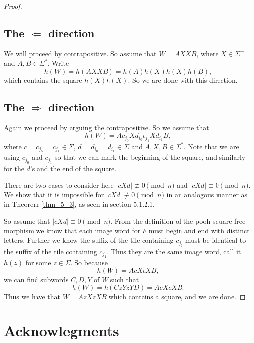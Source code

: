 \documentclass[12pt]{amsart}
\theoremstyle{definition}
\theoremstyle{plain}
\theoremstyle{nameit}
\theoremstyle{plain}
\begin{document}
\begin{onehalfspace}
\begin{proof}
\subsection{The $\Leftarrow$ direction} We will proceed by contrapositive. So assume that $W = AXXB$,
where $X\in\Sigma^+$ and $A,B\in\Sigma^*$. Write
\[h(W) = h(AXXB) = h(A)h(X)h(X)h(B),\]
which contains the square $h(X)h(X)$. So we are done with this direction.

\subsection{The $\Rightarrow$ direction} Again we proceed by arguing the contrapositive. So we assume
that
\begin{equation}
h(W) = Ac_{j_0}Xd_{i_0}c_{j_1}Xd_{i_1}B,
\label{eq_5_3}
\end{equation}
where $c=c_{j_0}=c_{j_1}\in\Sigma$, $d = d_{i_0} = d_{i_1}\in\Sigma$ and $A,X,B\in\Sigma^*$. Note that
we are using $c_{j_0}$ and $c_{j_1}$ so that we can mark the beginning of the square, and similarly for
the $d$'s and the end of the square.

There are two cases to consider here $|cXd|\not\equiv 0 \pmod{n}$ and $|cXd|\equiv 0 \pmod{n}$. We
show
that it is impossible for $|cXd|\not\equiv 0 \pmod{n}$ in an analogous manner as in Theorem
\ref{thm_5_3},
as seen in section 5.1.2.1.

So assume that $|cXd|\equiv 0 \pmod{n}$. From the definition of the pooh square-free morphism we know
that each image word for $h$ must begin and end with distinct letters. Further we know the suffix of the
tile containing $c_{j_0}$ must be identical to the suffix of the tile containing $c_{j_1}$. Thus they are the
same image word, call it $h(z)$ for some $z\in\Sigma$. So because
\[h(W) = AcXcXB,\]
we can find subwords $C,D,Y$ of $W$ such that
\[h(W) = h(CzYzYD) = AcXcXB.\]
Thus we have that $W = AzXzXB$ which contains a square, and we are done.
\end{proof}

\section{Acknowlegments}




\end{onehalfspace}
\end{document}
